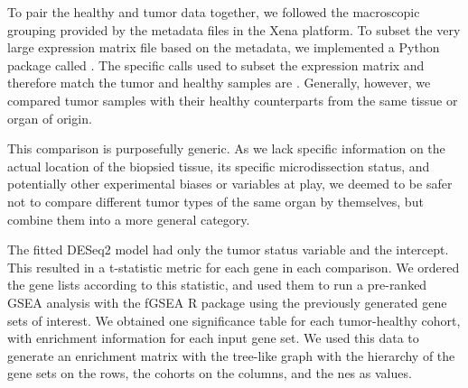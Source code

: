 To pair the healthy and tumor data together, we followed the macroscopic
grouping provided by the metadata files in the Xena platform. To subset the very
large expression matrix file based on the metadata, we implemented a Python
package called . The specific calls used to subset the
expression matrix and therefore match the tumor and healthy samples are
. Generally, however, we compared tumor samples with
their healthy counterparts from the same tissue or organ of origin.

This comparison is purposefully generic. As we lack specific information on the
actual location of the biopsied tissue, its specific microdissection status, and
potentially other experimental biases or variables at play, we deemed to be
safer not to compare different tumor types of the same organ by themselves, but
combine them into a more general category.


The fitted DESeq2 model had only the tumor status variable and the intercept.
This resulted in a t-statistic metric for each gene in each comparison. We
ordered the gene lists according to this statistic, and used them to run a
pre-ranked GSEA analysis with the fGSEA R package
\cite{korotkevichFastGeneSet2021} using the previously generated gene sets of
interest.
We obtained one significance table for each tumor-healthy cohort, with
enrichment information for each input gene set. We used this data to generate an
enrichment matrix with the tree-like graph with the hierarchy of the gene sets on
the rows, the cohorts on the columns, and the \gls{nes} as values.

